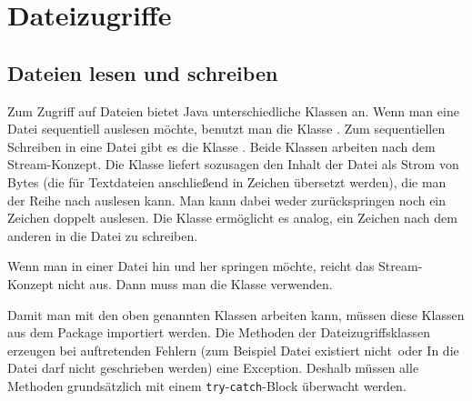\chapter{Dateizugriffe}
\renewcommand{\chaptertitle}{Dateizugriffe}

\lehead[]{\normalfont\sffamily\hspace*{-2.00cm}\textcolor{white}{\colorbox{lightblue}{\makebox[1.60cm][r]{\thechapter}}}\hspace{0.17cm}\textcolor{lightblue}{\chaptertitle}}
\rohead[]{\textcolor{lightblue}{\chaptertitle}\normalfont\sffamily\hspace*{0.17cm}\textcolor{white}{\colorbox{lightblue}{\makebox[1.60cm][l]{\thechapter}}}\hspace{-2.00cm}}
\rehead[]{\textcolor{lightblue}{AvHG, Inf, My}}
\lohead[]{\textcolor{lightblue}{AvHG, Inf, My}}

\lstset{style=myJava}

\section{Dateien lesen und schreiben}

Zum Zugriff auf Dateien bietet Java unterschiedliche Klassen an. Wenn man eine
Datei sequentiell auslesen möchte, benutzt man die Klasse
. Zum sequentiellen Schreiben in eine Datei gibt es die
Klasse . Beide Klassen arbeiten nach dem
Stream-Konzept. Die Klasse  liefert sozusagen den
Inhalt der Datei als Strom von Bytes (die für Textdateien anschließend in
Zeichen übersetzt werden), die man der Reihe nach auslesen kann. Man kann dabei
weder zurückspringen noch ein Zeichen doppelt auslesen. Die Klasse
 ermöglicht es analog, ein Zeichen nach dem anderen in
die Datei zu schreiben.

Wenn man in einer Datei hin und her springen möchte, reicht das Stream-Konzept
nicht aus. Dann muss man die Klasse  verwenden.

Damit man mit den oben genannten Klassen arbeiten kann, müssen diese Klassen
aus dem Package  importiert werden. Die Methoden der
Dateizugriffsklassen erzeugen bei auftretenden Fehlern (zum Beispiel \glqq Datei
existiert nicht\grqq\ oder \glqq In die Datei darf nicht geschrieben
werden\grqq ) eine Exception. Deshalb müssen alle Methoden grundsätzlich mit
einem \lstinline|try|-\lstinline|catch|-Block überwacht werden.


